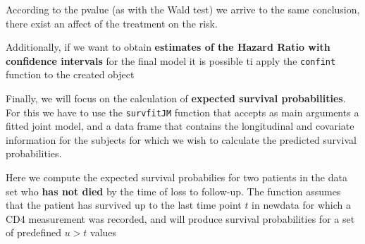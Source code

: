 \documentclass[]{book}
\makeatletter
\newenvironment{Shaded}{\begin{snugshade}}{\end{snugshade}}
\newcommand{\KeywordTok}[1]{\textcolor[rgb]{0.13,0.29,0.53}{\textbf{#1}}}
\newcommand{\DataTypeTok}[1]{\textcolor[rgb]{0.13,0.29,0.53}{#1}}
\newcommand{\StringTok}[1]{\textcolor[rgb]{0.31,0.60,0.02}{#1}}
\newcommand{\NormalTok}[1]{#1}
\newenvironment{kframe}{%
\medskip{}
\setlength{\fboxsep}{.8em}
 \def\at@end@of@kframe{}%
 \ifinner\ifhmode%
  \def\at@end@of@kframe{\end{minipage}}%
  \begin{minipage}{\columnwidth}%
 \fi\fi%
 \def\FrameCommand##1{\hskip\@totalleftmargin \hskip-\fboxsep
 \colorbox{shadecolor}{##1}\hskip-\fboxsep
     \hskip-\linewidth \hskip-\@totalleftmargin \hskip\columnwidth}%
 \MakeFramed {\advance\hsize-\width
   \@totalleftmargin\z@ \linewidth\hsize
   \@setminipage}}%
 {\par\unskip\endMakeFramed%
 \at@end@of@kframe}
\renewenvironment{Shaded}{\begin{kframe}}{\end{kframe}}
\theoremstyle{definition}
\theoremstyle{definition}
\theoremstyle{definition}
\theoremstyle{remark}
\makeatother
\begin{document}
According to the pvalue (as with the Wald test) we arrive to the same
conclusion, there exist an affect of the treatment on the risk.

Additionally, if we want to obtain \textbf{estimates of the Hazard Ratio
with confidence intervals} for the final model it is possible ti apply
the \texttt{confint} function to the created object

\begin{Shaded}
\end{Shaded}

Finally, we will focus on the calculation of \textbf{expected survival
probabilities}. For this we have to use the \texttt{survfitJM} function
that accepts as main arguments a fitted joint model, and a data frame
that contains the longitudinal and covariate information for the
subjects for which we wish to calculate the predicted survival
probabilities.

Here we compute the expected survival probabilies for two patients in
the data set who \textbf{has not died} by the time of loss to follow-up.
The function assumes that the patient has survived up to the last time
point \(t\) in newdata for which a CD4 measurement was recorded, and
will produce survival probabilities for a set of predefined \(u > t\)
values
\end{document}
